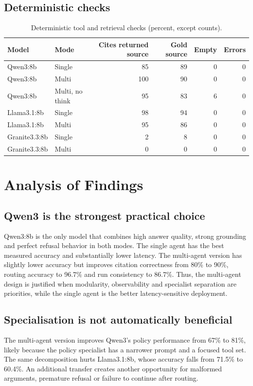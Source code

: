 \documentclass[11pt,a4paper]{article}
\begin{document}
\subsection{Deterministic checks}
\begin{table}[H]
\centering
\caption{Deterministic tool and retrieval checks (percent, except counts).}
\label{tab:deterministic}
\small
\begin{tabular}{llrrrr}
\toprule
\textbf{Model} & \textbf{Mode} & \textbf{Cites returned source} & \textbf{Gold source} & \textbf{Empty} & \textbf{Errors}\\
\midrule
Qwen3:8b & Single & 85 & 89 & 0 & 0\\
Qwen3:8b & Multi & 100 & 90 & 0 & 0\\
Qwen3:8b & Multi, no think & 95 & 83 & 6 & 0\\
Llama3.1:8b & Single & 98 & 94 & 0 & 0\\
Llama3.1:8b & Multi & 95 & 86 & 0 & 0\\
Granite3.3:8b & Single & 2 & 8 & 0 & 0\\
Granite3.3:8b & Multi & 0 & 0 & 0 & 0\\
\bottomrule
\end{tabular}
\end{table}

\section{Analysis of Findings}
\label{sec:findings}

\subsection{Qwen3 is the strongest practical choice}
Qwen3:8b is the only model that combines high answer quality, strong grounding and perfect refusal behavior in both modes. The single agent has the best measured accuracy and substantially lower latency. The multi-agent version has slightly lower accuracy but improves citation correctness from 80\% to 90\%, routing accuracy to 96.7\% and run consistency to 86.7\%. Thus, the multi-agent design is justified when modularity, observability and specialist separation are priorities, while the single agent is the better latency-sensitive deployment.

\subsection{Specialisation is not automatically beneficial}
The multi-agent version improves Qwen3's policy performance from 67\% to 81\%, likely because the policy specialist has a narrower prompt and a focused tool set. The same decomposition hurts Llama3.1:8b, whose accuracy falls from 71.5\% to 60.4\%. An additional transfer creates another opportunity for malformed arguments, premature refusal or failure to continue after routing.
\end{document}
